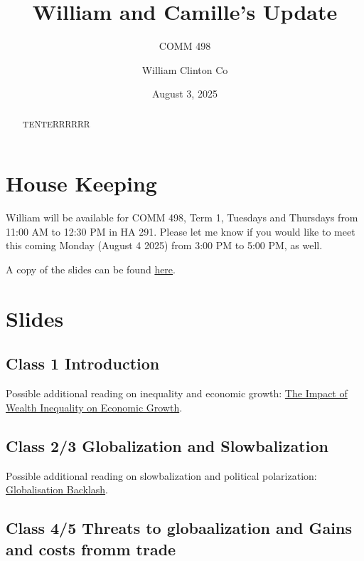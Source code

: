 \documentclass[
  11pt,
]{article}
\title{William and Camille's Update}
\subtitle{COMM 498}
\author{William Clinton Co}
\date{August 3, 2025}
\renewcommand*\contentsname{Table of contents}
\newcommand\contentsname{Table of contents}
\begin{document}
\maketitle
\begin{abstract}
TENTERRRRRR
\end{abstract}

\renewcommand*\contentsname{Table of contents}
{
\hypersetup{linkcolor=}
\setcounter{tocdepth}{3}
\tableofcontents
}

\section{House Keeping}\label{house-keeping}

William will be available for COMM 498, Term 1, Tuesdays and Thursdays
from 11:00 AM to 12:30 PM in HA 291. Please let me know if you would
like to meet this coming Monday (August 4 2025) from 3:00 PM to 5:00 PM,
as well.

A copy of the slides can be found
\href{https://drive.google.com/drive/folders/1mERxpYGLjzyM1umdXgnxXbv5GSljAkrd?usp=sharing}{here}.

\section{Slides}\label{slides}

\subsection{Class 1 Introduction}\label{class-1-introduction}

Possible additional reading on inequality and economic growth:
\href{https://cepr.org/voxeu/columns/impact-wealth-inequality-economic-growth-evidence-italy-during-its-structural}{The
Impact of Wealth Inequality on Economic Growth}.

\subsection{Class 2/3 Globalization and
Slowbalization}\label{class-23-globalization-and-slowbalization}

Possible additional reading on slowbalization and political
polarization:
\href{https://cepr.org/voxeu/columns/globalisation-backlash}{Globalisation
Backlash}.

\subsection{Class 4/5 Threats to globaalization and Gains and costs
fromm
trade}\label{class-45-threats-to-globaalization-and-gains-and-costs-fromm-trade}
\end{document}
